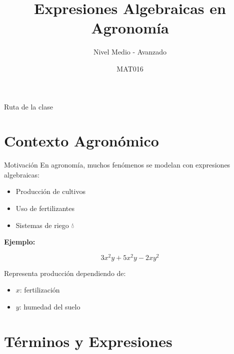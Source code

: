 \documentclass[aspectratio=169,12pt]{beamer}
\title{Expresiones Algebraicas en Agronomía}
\subtitle{Nivel Medio - Avanzado}
\author{MAT016}
\date{}
\begin{document}
	
	\begin{frame}
		\titlepage
	\end{frame}
	
	\begin{frame}{Ruta de la clase}
		\tableofcontents
	\end{frame}
	
	\section{Contexto Agronómico}
	
	\begin{frame}{Motivación}
		En agronomía, muchos fenómenos se modelan con expresiones algebraicas:
		
		\pause
		
		\begin{itemize}
			\item Producción de cultivos 🌾
			\item Uso de fertilizantes 🌱
			\item Sistemas de riego 💧
		\end{itemize}
		
		\pause
		
		\textbf{Ejemplo:}
		
		\[
		3x^2y + 5x^2y - 2xy^2
		\]
		
		\pause
		
		Representa producción dependiendo de:
		\begin{itemize}
			\item $x$: fertilización
			\item $y$: humedad del suelo
		\end{itemize}
		
	\end{frame}
	
	\section{Términos y Expresiones}
	
\end{document}
